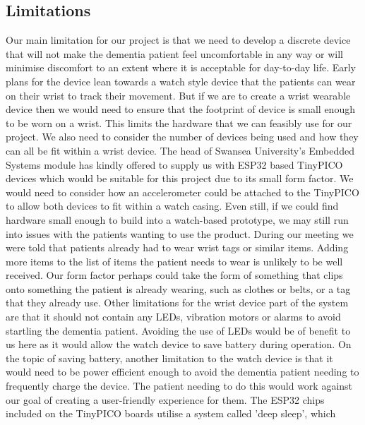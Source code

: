        \subsection{Limitations}
            Our main limitation for our project is that we need to develop a discrete device that will not make the
            dementia patient feel uncomfortable in any way or will minimise discomfort to an extent where it is
            acceptable for day-to-day life. Early plans for the device lean towards a watch style device that the
            patients can wear on their wrist to track their movement. But if we are to create a wrist wearable device
            then we would need to ensure that the footprint of device is small enough to be worn on a wrist. This limits
            the hardware that we can feasibly use for our project. We also need to consider the number of devices being
            used and how they can all be fit within a wrist device. The head of Swansea University’s Embedded Systems
            module has kindly offered to supply us with ESP32 based TinyPICO devices which would be suitable for this
            project due to its small form factor. We would need to consider how an accelerometer could be attached to
            the TinyPICO to allow both devices to fit within a watch casing. Even still, if we could find hardware small
            enough to build into a watch-based prototype, we may still run into issues with the patients wanting to use
            the product. During our meeting we were told that patients already had to wear wrist tags or similar items.
            Adding more items to the list of items the patient needs to wear is unlikely to be well received. Our form
            factor perhaps could take the form of something that clips onto something the patient is already wearing,
            such as clothes or belts, or a tag that they already use. Other limitations for the wrist device part of the
            system are that it should not contain any LEDs, vibration motors or alarms to avoid startling the dementia
            patient. Avoiding the use of LEDs would be of benefit to us here as it would allow the watch device to save
            battery during operation. On the topic of saving battery, another limitation to the watch device is that it
            would need to be power efficient enough to avoid the dementia patient needing to frequently charge the
            device. The patient needing to do this would work against our goal of creating a user-friendly experience
            for them. The ESP32 chips included on the TinyPICO boards utilise a system called 'deep sleep', which
